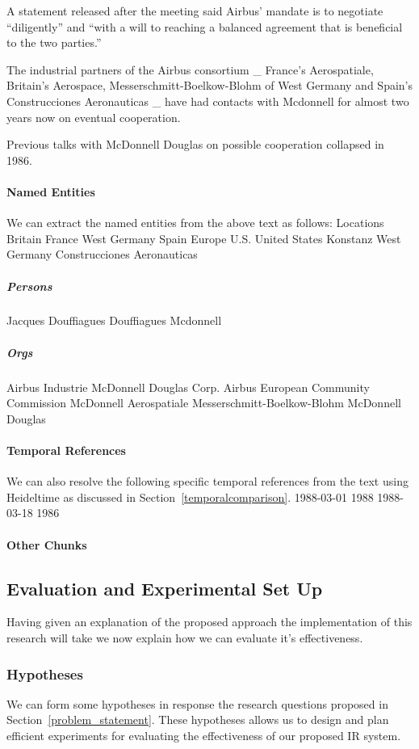 \documentclass{mprop}
\begin{document}
A statement released after the meeting said Airbus' mandate is to negotiate ``diligently'' and ``with a will to reaching a balanced agreement that is beneficial to the two parties.''

The industrial partners of the Airbus consortium \_ France's Aerospatiale, Britain's Aerospace, Messerschmitt-Boelkow-Blohm of West Germany and Spain's Construcciones Aeronauticas \_ have had contacts with Mcdonnell for almost two years now on eventual cooperation.

Previous talks with McDonnell Douglas on possible cooperation collapsed in 1986.

\paragraph{Named Entities}
We can extract the named entities from the above text as follows:
Locations
Britain
France
West Germany
Spain
Europe
U.S.
United States
Konstanz
West Germany
Construcciones Aeronauticas
\subparagraph{Persons}
Jacques Douffiagues
Douffiagues
Mcdonnell
\subparagraph{Orgs}
Airbus Industrie
McDonnell Douglas Corp.
Airbus
European Community Commission
McDonnell
Aerospatiale
Messerschmitt-Boelkow-Blohm
McDonnell Douglas

\paragraph{Temporal References}
We can also resolve the following specific temporal references from the text using Heideltime as discussed in Section~\ref{temporalcomparison}.
1988-03-01
1988
1988-03-18
1986

\paragraph{Other Chunks}

\subsection{Evaluation and Experimental Set Up}
Having given an explanation of the proposed approach the implementation of this research will take we now explain how we can evaluate it's effectiveness.

\subsubsection{Hypotheses}
We can form some hypotheses in response the research questions proposed in Section~\ref{problem_statement}. These hypotheses allows us to design and plan efficient experiments for evaluating the effectiveness of our proposed IR system.
\end{document}
